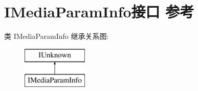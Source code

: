 \hypertarget{interface_i_media_param_info}{}\section{I\+Media\+Param\+Info接口 参考}
\label{interface_i_media_param_info}
类 I\+Media\+Param\+Info 继承关系图\+:\begin{figure}[H]
\begin{center}
\leavevmode
\includegraphics[height=2.000000cm]{interface_i_media_param_info}
\end{center}
\end{figure}
